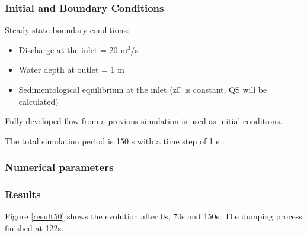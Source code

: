 %
%
\subsubsection{Initial and Boundary Conditions}
%
Steady state boundary conditions:
\begin{itemize}
\item{ Discharge at the inlet = 20 m$^3$/s}
\item Water depth at outlet = 1 m
\item Sedimentological equilibrium at the inlet (zF is constant, QS will be calculated)
\end{itemize}
Fully developed flow from a previous simulation is used as initial conditions.

The total simulation period is 150 s with a time step of 1 s . 
%
%
\subsubsection{Numerical parameters}
%
%
%
\subsubsection{Results}
%
Figure \ref{result50} shows the evolution after 0s, 70s and 150s. The dumping process finished at 122s.

